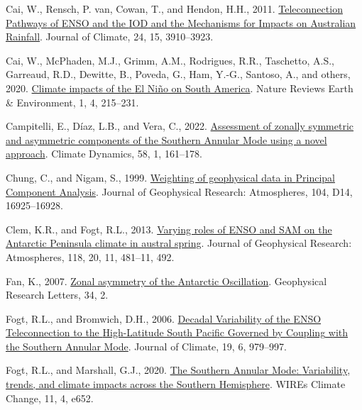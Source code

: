 \documentclass[12pt,oneside]{reedthesis}
\newlength{\cslhangindent}
\newenvironment{CSLReferences}[2] %
 {%
  \setlength{\parindent}{0pt}
  \ifodd #1 \everypar{\setlength{\hangindent}{\cslhangindent}}\ignorespaces\fi
  \ifnum #2 > 0
  \setlength{\parskip}{#2\baselineskip}
  \fi
 }%
 {}
\begin{document}
\begin{CSLReferences}{1}{0}
\leavevmode{}%
Cai, W., Rensch, P. van, Cowan, T., and Hendon, H.H., 2011. \href{https://doi.org/10.1175/2011JCLI4129.1}{Teleconnection {Pathways} of {ENSO} and the {IOD} and the {Mechanisms} for {Impacts} on {Australian Rainfall}}. Journal of Climate, 24, 15, 3910--3923.

\leavevmode{}%
Cai, W., McPhaden, M.J., Grimm, A.M., Rodrigues, R.R., Taschetto, A.S., Garreaud, R.D., Dewitte, B., Poveda, G., Ham, Y.-G., Santoso, A., and others, 2020. \href{https://doi.org/10.1038/s43017-020-0040-3}{Climate impacts of the {El Niño} on {South America}}. Nature Reviews Earth \& Environment, 1, 4, 215--231.

\leavevmode{}%
Campitelli, E., Díaz, L.B., and Vera, C., 2022. \href{https://doi.org/10.1007/s00382-021-05896-5}{Assessment of zonally symmetric and asymmetric components of the {Southern Annular Mode} using a novel approach}. Climate Dynamics, 58, 1, 161--178.

\leavevmode{}%
Chung, C., and Nigam, S., 1999. \href{https://doi.org/10.1029/1999JD900234}{Weighting of geophysical data in {Principal Component Analysis}}. Journal of Geophysical Research: Atmospheres, 104, D14, 16925--16928.

\leavevmode{}%
Clem, K.R., and Fogt, R.L., 2013. \href{https://doi.org/10.1002/jgrd.50860}{Varying roles of {ENSO} and {SAM} on the {Antarctic Peninsula} climate in austral spring}. Journal of Geophysical Research: Atmospheres, 118, 20, 11, 481--11, 492.

\leavevmode{}%
Fan, K., 2007. \href{https://doi.org/10.1029/2006GL028045}{Zonal asymmetry of the {Antarctic Oscillation}}. Geophysical Research Letters, 34, 2.

\leavevmode{}%
Fogt, R.L., and Bromwich, D.H., 2006. \href{https://doi.org/10.1175/JCLI3671.1}{Decadal {Variability} of the {ENSO Teleconnection} to the {High-Latitude South Pacific Governed} by {Coupling} with the {Southern Annular Mode}}. Journal of Climate, 19, 6, 979--997.

\leavevmode{}%
Fogt, R.L., and Marshall, G.J., 2020. \href{https://doi.org/10.1002/wcc.652}{The {Southern Annular Mode}: {Variability}, trends, and climate impacts across the {Southern Hemisphere}}. WIREs Climate Change, 11, 4, e652.


\end{CSLReferences}
\end{document}
